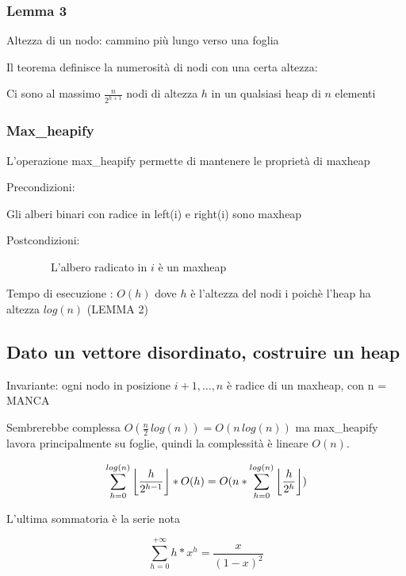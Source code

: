 \documentclass[tikz]{article}
\DeclarePairedDelimiter\floor{\lfloor}{\rfloor}
\begin{document}
{{{\subsubsection{Lemma 3}

{Altezza di un nodo: cammino più lungo verso una foglia}

{Il teorema definisce la numerosità di nodi con una certa altezza:}

{Ci sono al massimo $\frac{n}{2^{h+1}}$ nodi di altezza $h$ in
un qualsiasi heap di $n$ elementi}

\subsubsection{Max\_heapify}}}

{L'operazione max\_heapify permette di mantenere le proprietà di maxheap}

{Precondizioni:}

{Gli alberi binari con radice in left(i) e right(i) sono maxheap}

{Postcondizioni:}

{~~~~~~~~L'albero radicato in $i$ è un maxheap}



{Tempo di esecuzione : $O(h)$ dove $h$ è l'altezza del nodi i poichè l'heap ha altezza $log(n)$ (LEMMA 2)}

\subsection{Dato un vettore disordinato, costruire un heap}



{Invariante: ogni nodo in posizione $i+1,\ldots,n$ è radice di un maxheap, con n = MANCA}

{Sembrerebbe complessa $O(\frac{n}{2}\,log(n)) = O(n\,log(n))$ ma max\_heapify lavora principalmente su foglie, quindi la complessità è lineare $O(n)$.}

\begin{equation}
\sum_{h=0}^{log(n)}{\floor*{\frac{h}{2^{h-1}}}*O(h)} = O(n*\sum_{h=0}^{log(n)}{\floor*{\frac{h}{2^h}})}
\end{equation}

{L'ultima sommatoria è la serie nota}

\begin{equation}
\sum_{h=0}^{+\infty}{h*x^h} = \frac{x}{{(1-x)}^2}
\end{equation}

}
\end{document}
